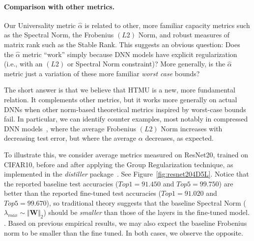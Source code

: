 \paragraph{Comparison with other metrics.}
Our Universality metric $\hat{\alpha}$ is related to other, more familiar capacity metrics such as the Spectral Norm, the Frobenius $(L2)$ Norm, and robust measures of matrix rank such as the Stable Rank.
This suggests an obvious question: 
Does the $\hat{\alpha}$ metric ``work'' simply because DNN models have explicit regularization (i.e., with an $(L2)$ or Spectral Norm constraint)?
More generally, is the $\hat{\alpha}$ metric just a variation of these more familiar \emph{worst case} bounds?  

The short answer is that we believe that HTMU is a new, more fundamental relation. 
It complements other metrics, but it works more generally on actual DNNs when other norm-based theoretical metrics inspired by worst-case bounds fail. 
In particular, we can identify counter examples, most notably in compressed DNN models~\cite{XXX-XXX-WHAT-IS-REF}, where the average Frobenius $(L2)$ Norm increases with decreasing test error, but where the average $\alpha$ decreases, as expected.  


To illustrate this, we consider average metrics measured on ResNet20, trained on CIFAR10, before and after applying the Group Regularization technique, 
as implemented in the \emph{distiller} package~\cite{XXX-ADDCITE}. 
See Figure~\ref{fig:resnet204D5L}.
Notice that the reported baseline test accuracies ($Top1=91.450$ and $Top5=99.750$) 
are better than the reported fine-tuned test accuracies ($Top1=91.020$ and $Top5=99.670$), so traditional theory suggests that the baseline Spectral Norm
($\lambda_{max}\sim\Vert\mathbf{W}\Vert_{2}$) should be \emph{smaller} than those of the layers in the fine-tuned model.
.
Based on previous empirical results, we may also expect the baseline Frobenius norm to be smaller than the fine tuned. 
In both cases, we observe the opposite.

